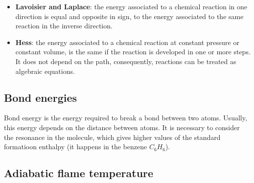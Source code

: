 \documentclass[12pt]{article}
\begin{document}
\begin{itemize}
    \item \textbf{Lavoisier and Laplace}: the energy associated to a chemical reaction in one direction is equal and opposite in sign, to the energy associated to the same reaction in the inverse direction.
    \item \textbf{Hess}: the energy associated to a chemical reaction at constant pressure or constant volume, is the same if the reaction is developed in one or more steps. It does not depend on the path, consequently, reactions can be treated as algebraic equations.
\end{itemize}

\subsection{Bond energies}

Bond energy is the energy required to break a bond between two atoms. Usually, this energy depends on the distance between atoms. It is necessary to consider the resonance in the molecule, which gives higher values of the standard formatioon enthalpy (it happens in the benzene $C_{6}H_{6}$).

\subsection{Adiabatic flame temperature}
\end{document}
